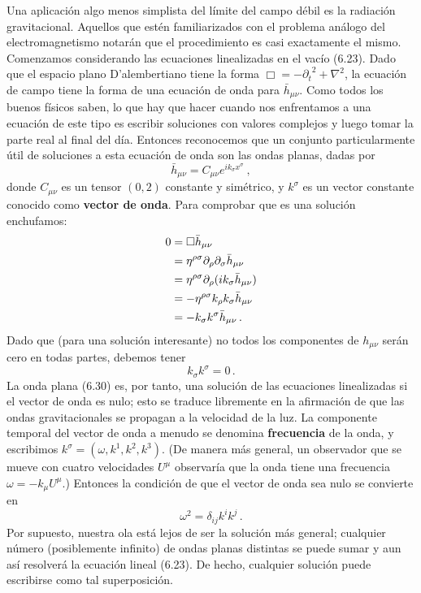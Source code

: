 \documentclass[11pt,b5paper,openany,twoside]{book}
\newcommand{\mn}{{\mu\nu}}
\newcommand{\p}[1]{{\partial_{#1}}}
\def\bh{{\bar h}}
\begin{document}
Una aplicación algo menos simplista del límite del campo débil es la radiación gravitacional.
Aquellos que estén familiarizados con el problema análogo del electromagnetismo notarán que el procedimiento es casi exactamente el mismo.
Comenzamos considerando las ecuaciones linealizadas en el vacío (6.23).
Dado que el espacio plano D'alembertiano tiene la forma $\Box = -\p{t}^2 +\nabla^2$, la ecuación de campo tiene la forma de una ecuación de onda para $\bh_\mn$.
Como todos los buenos físicos saben, lo que hay que hacer cuando nos enfrentamos a una ecuación de este tipo es escribir soluciones con valores complejos y luego tomar la parte real al final del día.
Entonces reconocemos que un conjunto particularmente útil de soluciones a esta ecuación de onda son las ondas planas, dadas por
\begin{equation}
\bh_\mn = C_\mn e^{ik_\sigma x^\sigma}\ ,\label{6.30}
\end{equation}
donde $C_\mn$ es un tensor $(0,2)$ constante y simétrico, y $k^\sigma$ es un vector constante conocido como {\bf vector de onda}.
Para comprobar que es una solución enchufamos:
\begin{align}
0 &=  \Box \bh_\mn \notag \\
&=  \eta^{\rho\sigma}\p\rho\p\sigma
\bh_\mn \notag \\
&=  \eta^{\rho\sigma}\p\rho (i k_\sigma\bh_\mn) \notag \\
&=  - \eta^{\rho\sigma}k_\rho k_\sigma\bh_\mn \notag \\
&=  -k_\sigma k^\sigma \bh_\mn\,. \label{6.31}
\end{align}
Dado que (para una solución interesante) no todos los componentes de $h_\mn$ serán cero en todas partes, debemos tener
\begin{equation}
k_\sigma k^\sigma=0\,.\label{6.32}
\end{equation}
La onda plana (6.30) es, por tanto, una solución de las ecuaciones linealizadas si el vector de onda es nulo; esto se traduce libremente en la afirmación de que las ondas gravitacionales se propagan a la velocidad de la luz.
La componente temporal del vector de onda a menudo se denomina {\bf frecuencia} de la onda, y escribimos $k^\sigma = (\omega, k^1,k^2,k^3)$.
(De manera más general, un observador que se mueve con cuatro velocidades $U^\mu$ observaría que la onda tiene una frecuencia $\omega=-k_\mu U^\mu$.)
Entonces la condición de que el vector de onda sea nulo se convierte en
\begin{equation}
\omega^2 = \delta_{ij}k^i k^j\,.\label{6.33}
\end{equation}
Por supuesto, nuestra ola está lejos de ser la solución más general; cualquier número (posiblemente infinito) de ondas planas distintas se puede sumar y aun así resolverá la ecuación lineal (6.23).
De hecho, cualquier solución puede escribirse como tal superposición.
\end{document}
